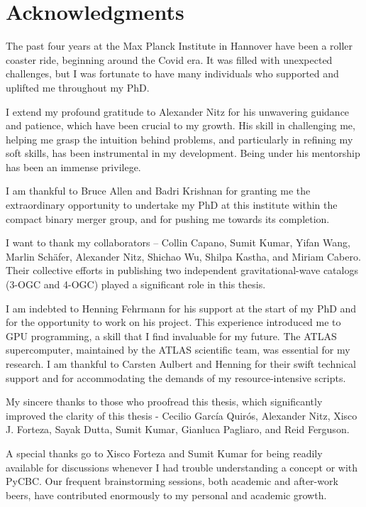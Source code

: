 \chapter{Acknowledgments}

The past four years at the Max Planck Institute in Hannover have been a roller coaster ride, beginning around the Covid era. It was filled with unexpected challenges, but I was fortunate to have many individuals who supported and uplifted me throughout my PhD.

I extend my profound gratitude to Alexander Nitz for his unwavering guidance and patience, which have been crucial to my growth. His skill in challenging me, helping me grasp the intuition behind problems, and particularly in refining my soft skills, has been instrumental in my development. Being under his mentorship has been an immense privilege.

I am thankful to Bruce Allen and Badri Krishnan for granting me the extraordinary opportunity to undertake my PhD at this institute within the compact binary merger group, and for pushing me towards its completion.

I want to thank my collaborators -- Collin Capano, Sumit Kumar, Yifan Wang, Marlin Sch\"afer, Alexander Nitz, Shichao Wu, Shilpa Kastha, and Miriam Cabero. Their collective efforts in publishing two independent gravitational-wave catalogs (3-OGC and 4-OGC) played a significant role in this thesis.

I am indebted to Henning Fehrmann for his support at the start of my PhD and for the opportunity to work on his project. This experience introduced me to GPU programming, a skill that I find invaluable for my future. The ATLAS supercomputer, maintained by the ATLAS scientific team, was essential for my research. I am thankful to Carsten Aulbert and Henning for their swift technical support and for accommodating the demands of my resource-intensive scripts.      

My sincere thanks to those who proofread this thesis, which significantly improved the clarity of this thesis - Cecilio García Quirós, Alexander Nitz, Xisco J. Forteza, Sayak Dutta, Sumit Kumar, Gianluca Pagliaro, and Reid Ferguson. 

A special thanks go to Xisco Forteza and Sumit Kumar for being readily available for discussions whenever I had trouble understanding a concept or with PyCBC. Our frequent brainstorming sessions, both academic and after-work beers, have contributed enormously to my personal and academic growth.

